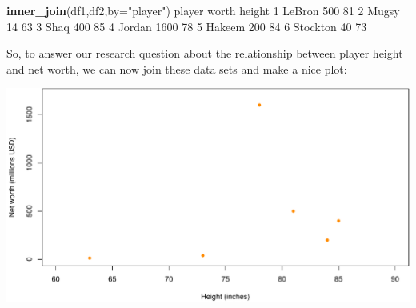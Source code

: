 \documentclass[
]{book}
\newenvironment{Shaded}{\begin{snugshade}}{\end{snugshade}}
\newcommand{\DataTypeTok}[1]{\textcolor[rgb]{0.13,0.29,0.53}{#1}}
\newcommand{\DecValTok}[1]{\textcolor[rgb]{0.00,0.00,0.81}{#1}}
\newcommand{\KeywordTok}[1]{\textcolor[rgb]{0.13,0.29,0.53}{\textbf{#1}}}
\newcommand{\NormalTok}[1]{#1}
\newcommand{\OperatorTok}[1]{\textcolor[rgb]{0.81,0.36,0.00}{\textbf{#1}}}
\newcommand{\StringTok}[1]{\textcolor[rgb]{0.31,0.60,0.02}{#1}}
\begin{document}
\begin{Shaded}
\begin{Highlighting}[]
\KeywordTok{inner_join}\NormalTok{(df1,df2,}\DataTypeTok{by=}\StringTok{"player"}\NormalTok{)}
\NormalTok{    player worth height}
\DecValTok{1}\NormalTok{   LeBron   }\DecValTok{500}     \DecValTok{81}
\DecValTok{2}\NormalTok{    Mugsy    }\DecValTok{14}     \DecValTok{63}
\DecValTok{3}\NormalTok{     Shaq   }\DecValTok{400}     \DecValTok{85}
\DecValTok{4}\NormalTok{   Jordan  }\DecValTok{1600}     \DecValTok{78}
\DecValTok{5}\NormalTok{   Hakeem   }\DecValTok{200}     \DecValTok{84}
\DecValTok{6}\NormalTok{ Stockton    }\DecValTok{40}     \DecValTok{73}
\end{Highlighting}
\end{Shaded}

So, to answer our research question about the relationship between player height and net worth, we can now join these data sets and make a nice plot:

\begin{Shaded}
\end{Shaded}

\includegraphics{figures/unnamed-chunk-398-1.pdf}
\end{document}
